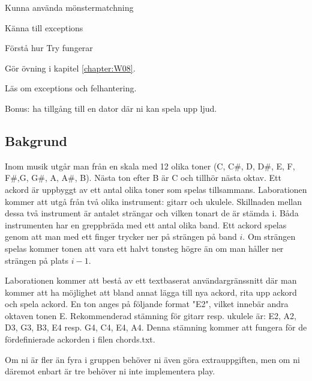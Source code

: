 

\Teamlab{\LabWeekEIGHT}

\begin{Goals}
\item Kunna använda mönstermatchning
\item Känna till exceptions
\item Förstå hur Try fungerar

\end{Goals}

\begin{Preparations}
\item Gör övning {\tt \ExeWeekEIGHT} i kapitel \ref{chapter:W08}.
\item Läs om exceptions och felhantering.
\item Bonus: ha tillgång till en dator där ni kan spela upp ljud.

\end{Preparations}

\subsection{Bakgrund}
Inom musik utgår man från en skala med 12 olika toner (C, C\#, D, D\#, E, F, F\#,G, G\#, A, A\#, B). Nästa ton efter B är C och tillhör nästa oktav. Ett ackord är uppbyggt av ett antal olika toner som spelas tillsammans. Laborationen kommer att utgå från två olika instrument: gitarr och ukulele. Skillnaden mellan dessa två instrument är antalet strängar och vilken tonart de är stämda i. Båda instrumenten har en greppbräda med ett antal olika band. Ett ackord spelas genom att man med ett finger trycker ner på strängen på band $i$. Om strängen spelas kommer tonen att vara ett halvt tonsteg högre än om man håller ner strängen på plats $i-1$.

Laborationen kommer att bestå av ett textbaserat användargränssnitt där man kommer att ha möjlighet att bland annat lägga till nya ackord, rita upp ackord och spela ackord. En ton anges på följande format "E2", vilket innebär andra oktaven tonen E. Rekommenderad stämning för gitarr resp. ukulele är: E2, A2, D3, G3, B3, E4 resp. G4, C4, E4, A4. Denna stämning kommer att fungera för de fördefinierade ackorden i filen chords.txt.

Om ni är fler än fyra i gruppen behöver ni även göra extrauppgiften, men om ni däremot enbart är tre behöver ni inte implementera play.

